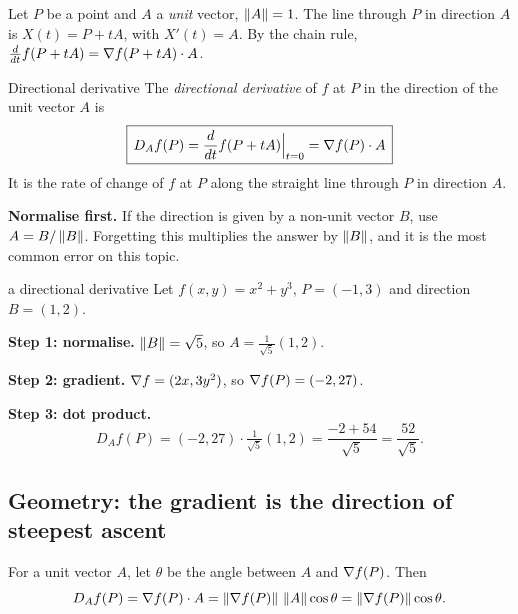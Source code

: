 Let $P$ be a point and $A$ a \emph{unit} vector, $\left\lVert A\right\rVert=1$. The line through $P$ in
direction $A$ is $X(t)=P+tA$, with $X'(t)=A$. By the chain rule,
$\frac{d}{dt}f(P+tA)=\nabla f(P+tA)\cdot A$.

\begin{definition}{Directional derivative}
The \emph{directional derivative} of $f$ at $P$ in the direction of the unit vector $A$ is
\[
\boxed{\,D_Af(P)=\frac{d}{dt}f(P+tA)\Big|_{t=0}=\nabla f(P)\cdot A\,}
\]
It is the rate of change of $f$ at $P$ along the straight line through $P$ in direction $A$.
\end{definition}


\begin{trap}
\textbf{Normalise first.} If the direction is given by a non-unit vector $B$, use
$A=B/\left\lVert B\right\rVert$. Forgetting this multiplies the answer by $\left\lVert B\right\rVert$, and it is the most
common error on this topic.
\end{trap}

\begin{example}{a directional derivative}
Let $f(x,y)=x^2+y^3$, $P=(-1,3)$ and direction $B=(1,2)$.

\textbf{Step 1: normalise.} $\left\lVert B\right\rVert=\sqrt5$, so $A=\frac{1}{\sqrt5}(1,2)$.

\textbf{Step 2: gradient.} $\nabla f=(2x,3y^2)$, so $\nabla f(P)=(-2,27)$.

\textbf{Step 3: dot product.}
\[ D_Af(P)=(-2,27)\cdot\tfrac{1}{\sqrt5}(1,2)=\frac{-2+54}{\sqrt5}=\frac{52}{\sqrt5}. \]
\end{example}

\subsection{Geometry: the gradient is the direction of steepest ascent}

For a unit vector $A$, let $\theta$ be the angle between $A$ and $\nabla f(P)$. Then
\[ D_Af(P)=\nabla f(P)\cdot A=\left\lVert \nabla f(P)\right\rVert\,\left\lVert A\right\rVert\cos\theta=\left\lVert \nabla f(P)\right\rVert\cos\theta . \]

\begin{center}
\end{center}

